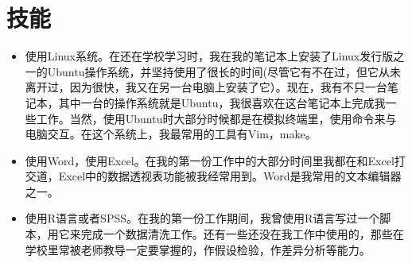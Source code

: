 \section{技能}
\begin{itemize}
	\item 使用Linux系统。在还在学校学习时，我在我的笔记本上安装了Linux发行版之一的Ubuntu操作系统，并坚持使用了很长的时间(尽管它有不在过，但它从未离开过，因为很快，我又在另一台电脑上安装了它）。现在，我有不只一台笔记本，其中一台的操作系统就是Ubuntu，我很喜欢在这台笔记本上完成我一些工作。当然，使用Ubuntu时大部分时候都是在模拟终端里，使用命令来与电脑交互。在这个系统上，我最常用的工具有Vim，make。
	\item 使用Word，使用Excel。在我的第一份工作中的大部分时间里我都在和Excel打交道，Excel中的数据透视表功能被我经常用到。Word是我常用的文本编辑器之一。
	\item 使用R语言或者SPSS。在我的第一份工作期间，我曾使用R语言写过一个脚本，用它来完成一个数据清洗工作。还有一些还没在我工作中使用的，那些在学校里常被老师教导一定要掌握的，作假设检验，作差异分析等能力。
\end{itemize}
